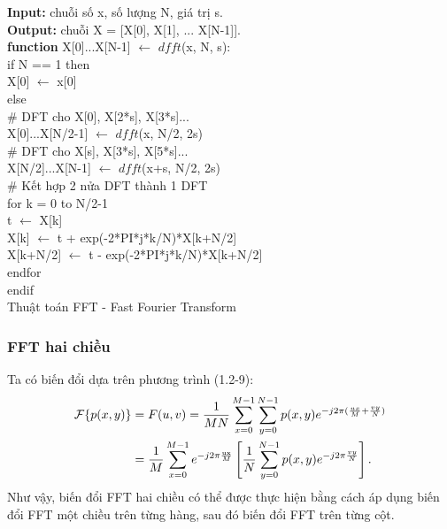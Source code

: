 \begin{algorithm}[H]
	\SetAlgoLined
	\textbf{Input: }chuỗi số x, số lượng N, giá trị s.\\
	\textbf{Output: }chuỗi X = [X[0], X[1], ... X[N-1]].\\
	\textbf{function } X[0]...X[N-1] $\leftarrow$ $dfft$(x, N, s):\\
	\hspace{10mm} if N == 1 then \\
	\hspace{20mm} X[0] $\leftarrow$ x[0]\\
	\hspace{10mm} else\\
	\hspace{20mm} \# DFT cho X[0], X[2*s], X[3*s]...\\
	\hspace{20mm} X[0]...X[N/2-1] $\leftarrow$ $dfft$(x, N/2, 2s)\\
	\hspace{20mm} \# DFT cho X[s], X[3*s], X[5*s]...\\
	\hspace{20mm} X[N/2]...X[N-1] $\leftarrow$ $dfft$(x+s, N/2, 2s)\\
	\hspace{20mm} \# Kết hợp 2 nửa DFT thành 1 DFT\\
	\hspace{20mm} for k = 0 to N/2-1\\
	\hspace{30mm} t $\leftarrow$ X[k]\\
	\hspace{30mm} X[k] $\leftarrow$ t + exp(-2*PI*j*k/N)*X[k+N/2]\\
	\hspace{30mm} X[k+N/2] $\leftarrow$ t - exp(-2*PI*j*k/N)*X[k+N/2]\\
	\hspace{20mm} endfor\\
	\hspace{10mm} endif\\
	\caption{Thuật toán FFT - Fast Fourier Transform}
\end{algorithm}

\subsubsection{FFT hai chiều}
\par Ta có biến đổi dựa trên phương trình (1.2-9):
\begin{align*}
	\mathcal{F} \{p(x,y)\} & = F(u,v) = \frac{1}{{MN}}\sum\limits_{x = 0}^{M - 1} {\sum\limits_{y = 0}^{N - 1} {p(x,y){e^{ - j2\pi (\frac{{ux}}{M} + \frac{{vy}}{N})}}} } \\
	& = \frac{1}{M}\sum\limits_{x = 0}^{M - 1} {{e^{ - j2\pi \frac{{{\rm{ux}}}}{M}}}} \left[ {\frac{1}{N}\sum\limits_{y = 0}^{N - 1} {p(x,y){e^{ - j2\pi \frac{{vy}}{N}}}} } \right].
\end{align*}
Như vậy, biến đổi FFT hai chiều có thể được thực hiện bằng cách áp dụng biến đổi FFT một chiều trên từng hàng, sau đó biến đổi FFT trên từng cột.
